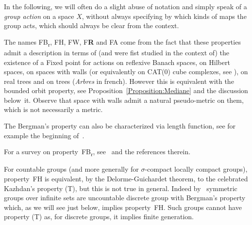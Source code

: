 \documentclass[a4paper]{article}
\theoremstyle{definition}
\newtheorem{rem}[lem]{Remark}
\newcommand*{\FB}{FB\textsubscript{r}}
\newcommand*{\FH}{FH}
\newcommand*{\FW}{FW}
\newcommand*{\FA}{FA}
\newcommand*{\FR}{F\textbf{R}}
\begin{document}
In the following, we will often do a slight abuse of notation and simply speak of a \emph{group action} on a space $X$, without always specifying by which kinds of maps the group acts, which should always be clear from the context.

%
%
The names \FB, \FH, \FW,  \FR{} and \FA{} come from the fact that these properties admit a description in terms of (and were fist studied in the context of) the existence of a Fixed point for actions on reflexive Banach spaces, on Hilbert spaces, on spaces with walls (or equivalently on CAT(0) cube complexes, see \cite{MR2197811,MR2059193}), on real trees and on trees (\emph{Arbres} in french).
However this is equivalent with the bounded orbit property, see Proposition~\ref{Proposition:Mediane} and the discussion below~it. Observe that space with walls admit a natural pseudo-metric on them, which is not necessarily a metric. 


The Bergman's property can also be characterized via length function, see for example the beginning of~\cite{MR4119107}.

For a survey on property~\FB, see~\cite{MR3382026} and the references therein.

For countable groups (and more generally for $\sigma$-compact locally compact groups), property~\FH{} is equivalent, by the Delorme-Guichardet theorem, to the celebrated Kazhdan's property (T), but this is not true in general.
Indeed by~\cite{MR2239037} symmetric groups over infinite sets are uncountable discrete group with Bergman's property which, as we will see just below, implies property~\FH.
Such groups cannot have property (T) as, for discrete groups, it implies finite generation.
\end{document}

